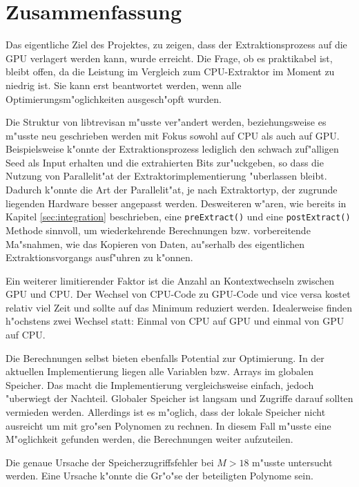 \section{Zusammenfassung}

Das eigentliche Ziel des Projektes, zu zeigen, dass der Extraktionsprozess auf die GPU verlagert werden kann, wurde erreicht. Die Frage, ob es praktikabel ist, bleibt offen, da die Leistung im Vergleich zum CPU-Extraktor im Moment zu niedrig ist. Sie kann erst beantwortet werden, wenn alle Optimierungsm"oglichkeiten ausgesch"opft wurden.

Die Struktur von libtrevisan m"usste ver"andert werden, beziehungsweise es m"usste neu geschrieben werden mit Fokus sowohl auf CPU als auch auf GPU. Beispielsweise k"onnte der Extraktionsprozess lediglich den schwach zuf"alligen Seed als Input erhalten und die extrahierten Bits zur"uckgeben, so dass die Nutzung von Parallelit"at der Extraktorimplementierung "uberlassen bleibt. Dadurch k"onnte die Art der Parallelit"at, je nach Extraktortyp, der zugrunde liegenden Hardware besser angepasst werden. Desweiteren w"aren, wie bereits in Kapitel \ref{sec:integration} beschrieben, eine \texttt{preExtract()} und eine \texttt{postExtract()} Methode sinnvoll, um wiederkehrende Berechnungen bzw. vorbereitende Ma"snahmen, wie das Kopieren von Daten, au"serhalb des eigentlichen Extraktionsvorgangs ausf"uhren zu k"onnen.

Ein weiterer limitierender Faktor ist die Anzahl an Kontextwechseln zwischen GPU und CPU. Der Wechsel von CPU-Code zu GPU-Code und vice versa kostet relativ viel Zeit und sollte auf das Minimum reduziert werden. Idealerweise finden h"ochstens zwei Wechsel statt: Einmal von CPU auf GPU und einmal von GPU auf CPU.

Die Berechnungen selbst bieten ebenfalls Potential zur Optimierung. In der aktuellen Implementierung liegen alle Variablen bzw. Arrays im globalen Speicher. Das macht die Implementierung vergleichsweise einfach, jedoch "uberwiegt der Nachteil. Globaler Speicher ist langsam und Zugriffe darauf sollten vermieden werden. Allerdings ist es m"oglich, dass der lokale Speicher nicht ausreicht um mit gro"sen Polynomen zu rechnen. In diesem Fall m"usste eine M"oglichkeit gefunden werden, die Berechnungen weiter aufzuteilen.

Die genaue Ursache der Speicherzugriffsfehler bei $M > 18$ m"usste untersucht werden. Eine Ursache k"onnte die Gr"o"se der beteiligten Polynome sein.

